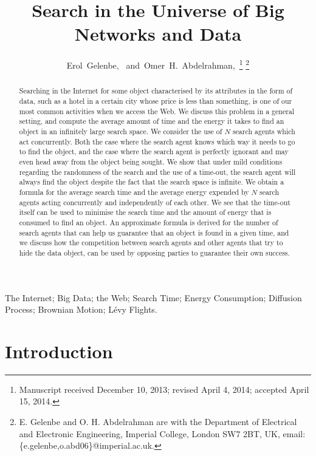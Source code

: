 \documentclass[journal]{IEEEtran}
\begin{document}
\title{Search in the Universe of Big Networks and Data}
\author{Erol~Gelenbe,~
        and~Omer~H.~Abdelrahman,~\thanks{Manuscript received December 10, 2013; revised April 4, 2014; accepted April 15, 2014.}
\thanks{E. Gelenbe and O. H. Abdelrahman are with the Department
of Electrical and Electronic Engineering, Imperial College, London SW7 2BT, UK, email: \{e.gelenbe,o.abd06\}@imperial.ac.uk.}}
\maketitle
\begin{abstract}
Searching in the Internet for some object characterised by its attributes in the form of data, such as a hotel in a certain city whose price is less than something, is one of our most common activities when we access the Web. We discuss this problem in a general setting, and compute the average amount of time and the energy it takes to find an object
in an infinitely large search space. We consider the use of $N$ search agents which act concurrently. Both
the case where the search agent knows which way it needs to go to find the object, and the case where the search agent is perfectly ignorant and may even head
away from the object being sought. We show that under mild conditions regarding the randomness of the search and the use of a time-out, the search agent will always find the object despite the fact that the search space is infinite. We obtain a formula for the average search time and the average energy expended by $N$ search agents acting concurrently and independently of each other. We see that the time-out itself can be used to minimise the search time and the amount of energy that is consumed to find an object. An approximate formula is derived for the number of search agents that can help us guarantee that an object is found in a  given time, and we discuss how
the competition between search agents and other agents that try to hide the data object, can be used by opposing parties to guarantee their own success.
\end{abstract}
\begin{IEEEkeywords} The Internet; Big Data;  the Web; Search Time;  Energy Consumption; Diffusion Process; Brownian Motion; L\'evy Flights.
\end{IEEEkeywords}




\section{Introduction}\label{Basic}
\end{document}
